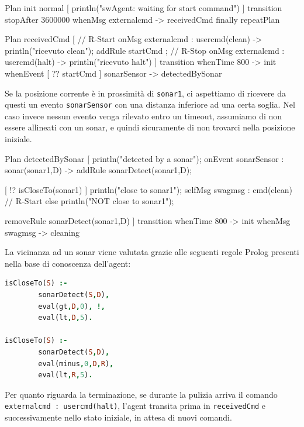 \documentclass{../llncs}
\newcommand{\codescript}[1]{{\mbox{\small{\texttt{#1}}}}\xspace}
\newcommand{\code}[1]{{\color{blue}\small{\texttt{#1}}}}
\begin{document}
\begin{qacode}[caption={SoftwareAgent, pt1}]
Plan init normal [
   	println("swAgent: waiting for start command")
]
transition stopAfter 3600000
	whenMsg externalcmd -> receivedCmd
finally repeatPlan

Plan receivedCmd [
	// R-Start
	onMsg externalcmd : usercmd(clean) -> {
   		println("ricevuto clean");
   		addRule startCmd
	};
	// R-Stop
   	onMsg externalcmd : usercmd(halt) -> println("ricevuto halt")
]
transition
	whenTime 800 -> init
	whenEvent [ ?? startCmd ] sonarSensor -> detectedBySonar
\end{qacode}

Se la posizione corrente è in prossimità di \code{sonar1}, ci aspettiamo di ricevere da questi un evento \codescript{sonarSensor} con una distanza inferiore ad una certa soglia. Nel caso invece nessun evento venga rilevato entro un timeout, assumiamo di non essere allineati con un sonar, e quindi sicuramente di non trovarci nella posizione iniziale.\\

\begin{qacode}[caption={SoftwareAgent, pt2}]
Plan detectedBySonar [
	println("detected by a sonar");
	onEvent sonarSensor : sonar(sonar1,D) -> addRule sonarDetect(sonar1,D);
	
	[ !? isCloseTo(sonar1) ] {
		println("close to sonar1");
		selfMsg swagmsg : cmd(clean) // R-Start
	}
	else
		println("NOT close to sonar1");
		
	removeRule sonarDetect(sonar1,D)
]
transition
	whenTime 800 -> init
	whenMsg swagmsg -> cleaning
\end{qacode}

La vicinanza ad un sonar viene valutata grazie alle seguenti regole Prolog presenti nella base di conoscenza dell'agent:\\

\begin{lstlisting}[language=Prolog, keywordstyle=\color{black}, caption={SoftwareAgent, Rules - pt1}]
isCloseTo(S) :-
		sonarDetect(S,D),
		eval(gt,D,0), !,
		eval(lt,D,5).
	
isCloseTo(S) :-
		sonarDetect(S,D),
		eval(minus,0,D,R),
		eval(lt,R,5).
\end{lstlisting}

Per quanto riguarda la terminazione, se durante la pulizia arriva il comando \codescript{externalcmd : usercmd(halt)}, l'agent transita prima in \codescript{receivedCmd} e successivamente nello stato iniziale, in attesa di nuovi comandi.\\
\end{document}

